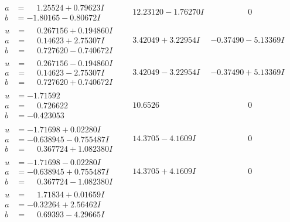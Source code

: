\documentclass[1p]{elsarticle_modified}
\theoremstyle{definition}
\begin{document}
$$\begin{array}{c|c|c}
\begin{aligned}
a &= \phantom{-}1.25524 + 0.79623 I \\
b &= -1.80165 - 0.80672 I\end{aligned}
 & \phantom{-}12.23120 - 1.76270 I & \phantom{-0.000000 } 0 \\ \hline\begin{aligned}
u &= \phantom{-}0.267156 + 0.194860 I \\
a &= \phantom{-}0.14623 + 2.75307 I \\
b &= \phantom{-}0.727620 - 0.740672 I\end{aligned}
 & \phantom{-}3.42049 + 3.22954 I & -0.37490 - 5.13369 I \\ \hline\begin{aligned}
u &= \phantom{-}0.267156 - 0.194860 I \\
a &= \phantom{-}0.14623 - 2.75307 I \\
b &= \phantom{-}0.727620 + 0.740672 I\end{aligned}
 & \phantom{-}3.42049 - 3.22954 I & -0.37490 + 5.13369 I \\ \hline\begin{aligned}
u &= -1.71592\phantom{ +0.000000I} \\
a &= \phantom{-}0.726622\phantom{ +0.000000I} \\
b &= -0.423053\phantom{ +0.000000I}\end{aligned}
 & \phantom{-}10.6526\phantom{ +0.000000I} & \phantom{-0.000000 } 0 \\ \hline\begin{aligned}
u &= -1.71698 + 0.02280 I \\
a &= -0.638945 - 0.755487 I \\
b &= \phantom{-}0.367724 + 1.082380 I\end{aligned}
 & \phantom{-}14.3705 - 4.1609 I & \phantom{-0.000000 } 0 \\ \hline\begin{aligned}
u &= -1.71698 - 0.02280 I \\
a &= -0.638945 + 0.755487 I \\
b &= \phantom{-}0.367724 - 1.082380 I\end{aligned}
 & \phantom{-}14.3705 + 4.1609 I & \phantom{-0.000000 } 0 \\ \hline\begin{aligned}
u &= \phantom{-}1.71834 + 0.01659 I \\
a &= -0.32264 + 2.56462 I \\
b &= \phantom{-}0.69393 - 4.29665 I\end{aligned}

\end{array}$$
\end{document}
